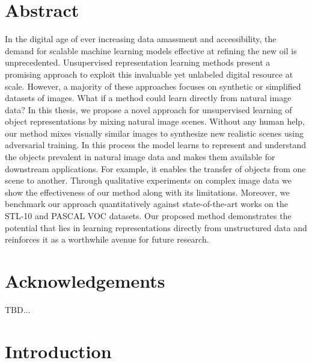 \documentclass[a4paper,12pt]{report}
\begin{document}
\chapter*{Abstract}
In the digital age of ever increasing data amassment and accessibility, the demand for scalable machine learning models effective at refining the new oil is unprecedented. Unsupervised representation learning methods present a promising approach to exploit this invaluable yet unlabeled digital resource at scale. However, a majority of these approaches focuses on synthetic or simplified datasets of images. What if a method could learn directly from natural image data? In this thesis, we propose a novel approach for unsupervised learning of object representations by mixing natural image scenes. Without any human help, our method mixes visually similar images to synthesize new realistic scenes using adversarial training. In this process the model learns to represent and understand the objects prevalent in natural image data and makes them available for downstream applications. For example, it enables the transfer of objects from one scene to another. Through qualitative experiments on complex image data we show the effectiveness of our method along with its limitations. Moreover, we benchmark our approach quantitatively against state-of-the-art works on the STL-10 and PASCAL VOC datasets. Our proposed method demonstrates the potential that lies in learning representations directly from unstructured data and reinforces it as a worthwhile avenue for future research.


\newpage
\chapter*{Acknowledgements}
TBD...


\newpage
\tableofcontents
\newpage
%

\chapter{Introduction}
\end{document}

